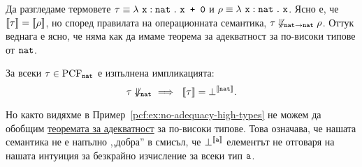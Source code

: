 \begin{example}
  Да разгледаме термовете $\tau \equiv \lambda~\texttt{x}:\texttt{nat}~.~{\texttt{x + 0}}$ и $\rho \equiv \lambda~\texttt{x}:\texttt{nat}~.~{\texttt{x}}$.
  Ясно е, че $\llbracket{\tau}\rrbracket = \llbracket{\rho}\rrbracket$, но според правилата на операционната семантика,
  $\tau \not\Downarrow_{\texttt{nat}\to\texttt{nat}} \rho$.
  Оттук веднага е ясно, че няма как да имаме теорема за адекватност за по-високи типове от $\texttt{nat}$.
\end{example}


\begin{corollary}
  За всеки $\tau \in \text{PCF}_{\texttt{nat}}$ е изпълнена импликацията:
  \[\tau \not\Downarrow_{\vv{nat}}\ \implies\ \val{\tau} = \bot^{\val{\vv{nat}}}.\]  
\end{corollary}




Но както видяхме в Пример~\ref{pcf:ex:no-adequacy-high-types} не можем да обобщим \hyperref[th:pcf:adequacy]{теоремата за адекватност} за по-високи типове.
Това означава, че нашата семантика не е напълно ,,добра'' в смисъл, че $\bot^{\llbracket{\texttt{a}}\rrbracket}$ елементът не
отговаря на нашата интуиция за безкрайно изчисление за всеки тип $\texttt{a}$.


